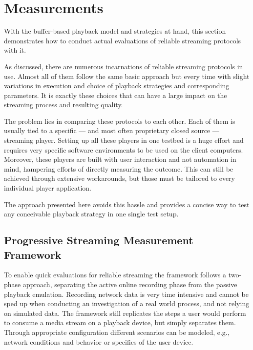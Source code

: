 \section{Measurements}
\label{c3:sec:measurements}

With the buffer-based playback model and strategies at hand, this section demonstrates how to conduct actual evaluations of reliable streaming protocols with it.

As discussed, there are numerous incarnations of reliable streaming protocols in use. Almost all of them follow the same basic approach but every time with slight variations in execution and choice of playback strategies and corresponding parameters. It is exactly these choices that can have a large impact on the streaming process and resulting quality. 

The problem lies in comparing these protocols to each other. Each of them is usually tied to a specific --- and most often proprietary closed source --- streaming player. Setting up all these players in one testbed is a huge effort and requires very specific software environments to be used on the client computers. Moreover, these players are built with user interaction and not automation in mind, hampering efforts of directly measuring the outcome. This can still be achieved through extensive workarounds, but those must be tailored to every individual player application. 

The approach presented here avoids this hassle and provides a concise way to test any conceivable playback strategy in one single test setup.


\subsection{Progressive Streaming Measurement Framework}

To enable quick evaluations for reliable streaming the framework follows a two-phase approach, separating the active online recording phase from the passive playback emulation. Recording network data is very time intensive and cannot be sped up when conducting an investigation of a real world process, and not relying on simulated data. The framework still replicates the steps a user would perform to consume a media stream on a playback device, but simply separates them. Through appropriate configuration different scenarios can be modeled, e.g., network conditions and behavior or specifics of the user device.
 
